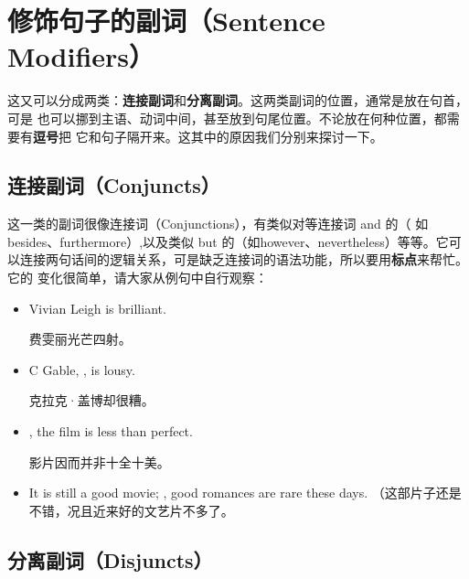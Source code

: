 \section{修饰句子的副词（Sentence Modifiers）}

这又可以分成两类：\textbf{连接副词}和\textbf{分离副词}。这两类副词的位置，通常是放在句首，可是
也可以挪到主语、动词中间，甚至放到句尾位置。不论放在何种位置，都需要有\textbf{逗号}把
它和句子隔开来。这其中的原因我们分别来探讨一下。

\subsection{连接副词（Conjuncts）}

这一类的副词很像连接词（Conjunctions），有类似对等连接词 and 的（
如besides、furthermore）,以及类似 but 的（如however、nevertheless）等等。它可
以连接两句话间的逻辑关系，可是缺乏连接词的语法功能，所以要用\textbf{标点}来帮忙。它的
变化很简单，请大家从例句中自行观察：

\begin{itemize}
\item Vivian Leigh is brilliant.

  费雯丽光芒四射。
\item C Gable, , is lousy.

  克拉克·盖博却很糟。
\item {}, the film is less than perfect.

  影片因而并非十全十美。
\item  It is still a good movie; , good romances are rare these days.
  （这部片子还是不错，况且近来好的文艺片不多了。
\end{itemize}

\subsection{分离副词（Disjuncts）}

